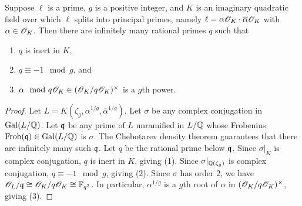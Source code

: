 \documentclass{amsart}
\begin{document}
\begin{lemma}\label{lem:K-exists}
  Suppose $\ell$ is a prime, $g$ is a positive integer, and $K$ is an imaginary quadratic field over which $\ell$ splits into principal primes, namely $\ell = \alpha\mathscr{O}_K \cdot \overline{\alpha}\mathscr{O}_K$ with $\alpha\in \mathscr{O}_K$.
Then there are infinitely many rational primes $q$ such that
    \begin{enumerate}
      \item $q$ is inert in $K$,
      \item $q \equiv -1 \mod{g}$, and
      \item $\alpha \mod q\mathscr{O}_K \in (\mathscr{O}_K/q\mathscr{O}_K)^\times$ is a $g$th power.
    \end{enumerate}
\end{lemma}
\begin{proof}
  Let $L = K(\zeta_g,\alpha^{1/g},\overline{\alpha}^{1/g})$.
  Let $\sigma$ be any complex conjugation in $\operatorname{Gal}(L/\mathbb{Q})$.
  Let $\frak{q}$ be any prime of $L$ unramified in $L/\mathbb{Q}$ whose Frobenius $\mathrm{Frob}(\frak{q}) \in \operatorname{Gal}(L/\mathbb{Q})$ is $\sigma$. The Chebotarev density theorem guarantees that there are infinitely many such $\frak{q}$.
  Let $q$ be the rational prime below $\frak{q}$.
  Since $\sigma|_K$ is complex conjugation, $q$ is inert in $K$, giving (1).
  Since $\sigma|_{\mathbb{Q}(\zeta_g)}$ is complex conjugation, $q \equiv -1 \mod{g}$, giving (2).
Since $\sigma$ has order $2$, we have $\mathscr{O}_L/\frak{q} \cong \mathscr{O}_K/q\mathscr{O}_K \cong \mathbb{F}_{q^2}$. In particular, $\alpha^{1/g}$ is a $g$th root of $\alpha$ in $(\mathscr{O}_K/q\mathscr{O}_K)^\times$, giving (3).
\end{proof}
\end{document}

